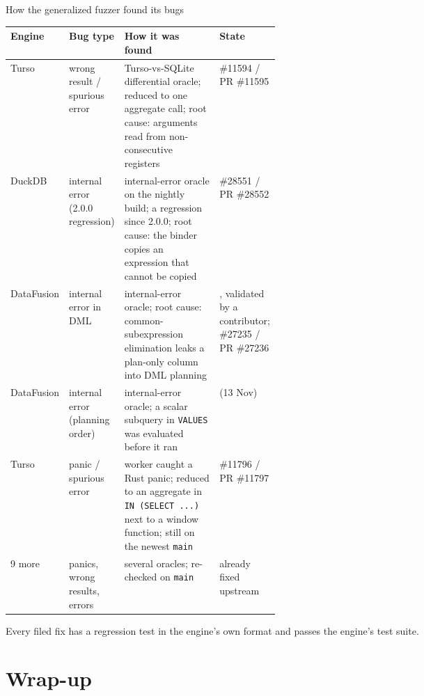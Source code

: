 \documentclass[aspectratio=169,10pt]{beamer}
\begin{document}
\begin{frame}{How the generalized fuzzer found its bugs}
\scriptsize
\begin{tabularx}{\linewidth}{@{}L{0.09\linewidth}L{0.16\linewidth}YL{0.2\linewidth}@{}}
\toprule
Engine & Bug type & How it was found & State \\
\midrule
Turso & wrong result / spurious error & Turso-vs-SQLite differential oracle; reduced to one aggregate call; root cause: arguments read from non-consecutive registers &  \#11594 / PR \#11595 \\
DuckDB & internal error (2.0.0 regression) & internal-error oracle on the nightly build; a regression since 2.0.0; root cause: the binder copies an expression that cannot be copied &  \#28551 / PR \#28552 \\
DataFusion & internal error in DML & internal-error oracle; root cause: common-subexpression elimination leaks a plan-only column into DML planning & , validated by a contributor; \#27235 / PR \#27236 \\
DataFusion & internal error (planning order) & internal-error oracle; a scalar subquery in \texttt{VALUES} was evaluated before it ran &  (13 Nov) \\
Turso & panic / spurious error & worker caught a Rust panic; reduced to an aggregate in \texttt{IN (SELECT ...)} next to a window function; still on the newest \texttt{main} &  \#11796 / PR \#11797 \\
9 more & panics, wrong results, errors & several oracles; re-checked on \texttt{main} & already fixed upstream \\
\bottomrule
\end{tabularx}

\medskip
\small Every filed fix has a regression test in the engine's own format and passes the engine's test suite.
\end{frame}

\section{Wrap-up}
\end{document}
